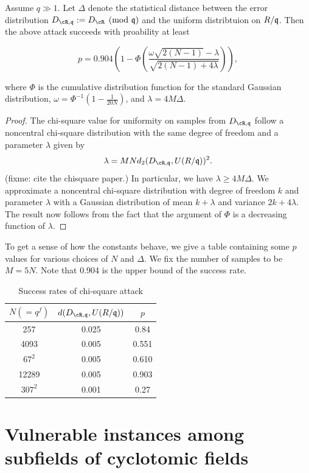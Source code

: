 \documentclass{amsart}
\begin{document}
\begin{theorem}
Assume $q \gg 1$. Let $\Delta$ denote the statistical distance between the error distribution $D_{\cR, \fq} := D_{\cR} \pmod{\fq}$ and the uniform distribtuion on $R/\mathfrak{q}$. Then the above attack succeeds with proability at least

$$p = 0.904 (1- \Phi(\frac{\omega \sqrt{2(N-1)}- \lambda}{\sqrt{2(N-1) +4\lambda}})),$$

where $\Phi$ is the cumulative distribution function for the standard Gaussian distribution, $\omega = \Phi^{-1}(1- \frac{1}{20N})$, and $\lambda = 4 M \Delta$.
\end{theorem}

\begin{proof}
The chi-square value for uniformity on samples from $D_{\cR, \fq}$ follow a noncentral chi-square distribution with the same degree of freedom and a parameter $\lambda$ given by
\[
    \lambda = MN d_2(D_{\cR, \fq}, U(R/\fq))^2.
\]
(fixme: cite the chisquare paper.)
In particular, we have $\lambda \geq  4M\Delta$.
We approximate a noncentral chi-square distribution with
degree of freedom $k$ and parameter $\lambda$ with a Gaussian
distribution of mean $k + \lambda$ and variance $2k + 4\lambda$. The result now follows from the fact that the argument of $\Phi$ is a decreasing function of $\lambda$.
\end{proof}

To get a sense of how the constants behave, we give a table containing some $p$ values for various choices of $N$ and $\Delta$. We fix the number of samples to be $M = 5N$. Note that 0.904 is the upper bound of the success rate.

\begin{table}[H]
\caption{Success rates of chi-square attack}
\begin{tabular}{c|c|c}
$N (= q^f)$ & $d(D_{\cR, \fq},U(R/\fq))$ & $p$ \\ \hline
257 & 0.025 & 0.84 \\
4093 &   0.005     &  0.551 \\
$67^2$ & 0.005 & 0.610 \\
12289 & 0.005  & 0.903 \\
$307^2$ & 0.001 & 0.27
\end{tabular}
\end{table}

\section{Vulnerable instances among subfields of cyclotomic fields}\label{sec: sub-cyclotomics}
\end{document}

